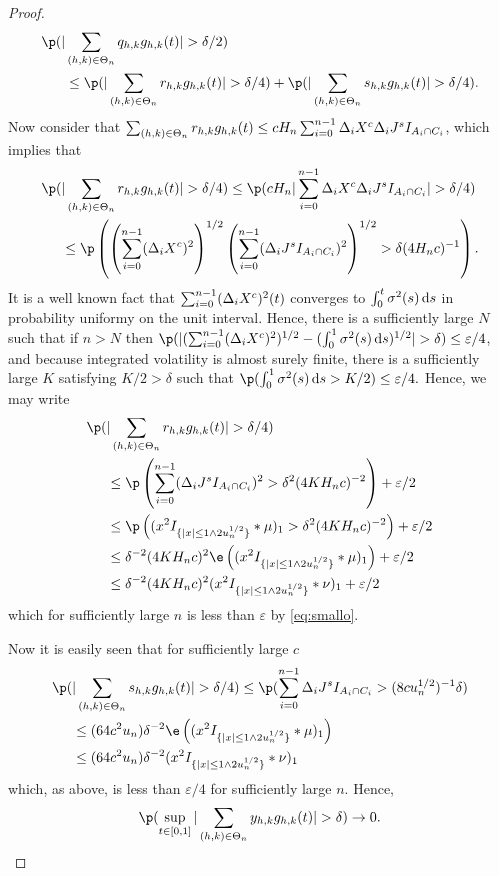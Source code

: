 \begin{proof}
\begin{align}
 \p(\vert&\sumt q_{h,k} \ghk(t) \vert > \delta/2)\notag \\&  \le\p(\vert\sumt r_{h,k} \ghk(t) \vert > \delta/4) + \p(\vert\sumt s_{h,k} \ghk(t) \vert > \delta/4).\notag
  \label{}
\end{align}
Now consider that $\sum_{(h,k) \in \Theta_n} r_{h,k} g_{h,k}(t) \le  c H_n \sum_{i = 0}^{n-1} \Delta_i X^c \Delta_i J^s I_{A_i \cap C_i}$, which implies that  
\begin{align}
  \p(&\vert\sumt r_{h,k} \ghk(t) \vert > \delta/4) \le \p(c H_n \vert \sumin \dxc \djt I_{A_i \cap C_i} \vert  > \delta/4)\notag\\& \le \p\left( \left(\sumin (\dxc)^2\right)^{1/2} \left(\sumin ( \djt I_{A_i \cap C_i})^2\right)^{1/2} > \delta (4H_nc)^{-1}\right).\notag
  \label{}
\end{align}
It is a well known fact that  $\sum_{i = 0}^{n-1} (\Delta_i X^c)^2 (t)$ converges to $\int_0^t\sigma^2(s)\D s$ in probability uniformy on the unit interval. Hence, there is a sufficiently large $N$ such that if $n > N$ then $ \p(\vert (\sumin (\dxc)^2)^{1/2}  - (\int_0^1\sigma^2(s) \D s)^{1/2}\vert > \delta ) \le  \varepsilon/4$, and because integrated volatility is almost surely finite, there is a sufficiently large $K$ satisfying  $K/2 > \delta$ such that $\p( \int_0^1\sigma^2(s) \D s > K/2) \le \varepsilon/4.$ Hence, we may write
\begin{align}
\p(&\vert\sumt r_{h,k} \ghk(t) \vert > \delta/4) \notag \\&\le \p\left(\sumin ( \djt I_{A_i \cap C_i})^2 > \delta^2 (4K H_nc)^{-2}\right) + \varepsilon/2\notag\\&\le  \p\left( (x^2I_{\{\vert x\vert \le 1 \wedge 2 u_n^{1/2}\}}\ast\mu)_1 > \delta^2 (4K H_nc)^{-2}\right) + \varepsilon/2\notag\\
&\le \delta^{-2} (4K H_nc)^{2}\e\left( (x^2I_{\{\vert x\vert \le 1 \wedge 2 u_n^{1/2}\}}\ast\mu)_1  \right) + \varepsilon/2\notag\\
&\le \delta^{-2} (4K H_nc)^{2} (x^2I_{\{\vert x\vert \le 1 \wedge 2 u_n^{1/2}\}}\ast\nu)_1   + \varepsilon/2\notag
  \label{}
\end{align}
which for sufficiently large $n$ is  less than $\varepsilon$ by \eqref{eq:smallo}.

Now it is easily seen that for sufficiently large $c$
\begin{align}
  \p(&\vert \sumt s_{h,k} \ghk(t) \vert > \delta/4) \le \p( \sumin  \djt I_{A_i \cap C_i} > (8 c u_n^{1/2})^{-1}\delta) \notag\\
  &\le (64 c^2 u_n)\delta^{-2} \e\left( (x^2I_{\{\vert x\vert \le 1 \wedge 2 u_n^{1/2}\}}\ast\mu)_1  \right)\notag \\
  & \le  (64 c^2 u_n)\delta^{-2} (x^2I_{\{\vert x\vert \le 1 \wedge 2 u_n^{1/2}\}}\ast\nu)_1
  \label{}
\end{align}
which, as above, is  less than $\varepsilon/4$ for sufficiently large $n$.
Hence, 
\begin{align}
  \notag
  \p(\sup_{t \in [0,1]}\vert \sumt y_{h,k} \ghk(t) \vert > \delta) \to 0.\label{eq:y}
\end{align}


\end{proof}
